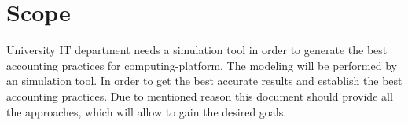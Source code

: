 \section{Scope} \label{s:introduction:scope}
	\begin{comment}
		$<$Describe the purpose, goals, and scope of the system/software test effort. Include a description of any
		tailoring of this standard that has been implemented. Identify the project(s) for which the Plan is being
		written and the specific processes and products covered by the test effort. Describe the inclusions,
		exclusions, and assumptions/limitations. It is important to define clearly the limits of the test effort for
		any test plan. This is most clearly done by specifying what is being included (inclusions) and equally
		important, what is being excluded (exclusions) from the test effort. For example, only the current new
		version of a product might be included and prior versions might be excluded from a specific test effort.
		In addition, there may be gray areas for the test effort (assumptions and/or limitations) where
		management discretion or technical assumptions are being used to direct or influence the test effort.
		For example, system subcomponents purchased from other suppliers might be assumed to have been
		tested by their originators, and thus, their testing in this effort would be limited to only test the features
		used as subcomponents in the new system.If the development is based on a “waterfall” methodology, then each level of the test will be executed
		only one time. However, if the development is based on an iterative methodology, then there will be
		multiple iterations of each level of test. For example, component testing may be taking place on the
		most recent iteration at the same time that acceptance testing is taking place on products that were
		developed during an earlier iteration.
		The test approach identifies what will be tested and in what order for the entire gamut of testing levels
		(component, component integration, system, and acceptance). The test approach identifies the rationale
		for testing or not testing, and it identifies the rationale for the selected order of testing. The test
		approach describes the relationship to the development methodology. The test approach may identify
		the types of testing done at the different levels. For example, “thread testing” may be executed at a
		system level, whereas “requirements testing” may take place at the component integration as well as at
		a systems integration level.
		The documentation (LTP, LTD, LTC, LTPr, LTR, and LITSR) required is dependent on the selection
		of the test approach(es).$>$
	\end{comment}
	University IT department needs a simulation tool in order to generate the best accounting practices for \gls{computing-platform}. The modeling will be performed by an simulation tool. In order to get the best accurate results and establish the best accounting practices. Due to mentioned reason this document should provide all the approaches, which will allow to gain the desired goals.
	
